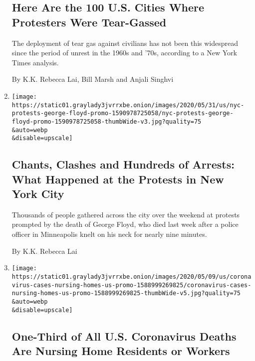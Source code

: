 \begin{enumerate}
  \hypertarget{here-are-the-100-us-cities-where-protesters-were-tear-gassed}{%
  \subsection{Here Are the 100 U.S. Cities Where Protesters Were
  Tear-Gassed}\label{here-are-the-100-us-cities-where-protesters-were-tear-gassed}}

  The deployment of tear gas against civilians has not been this
  widespread since the period of unrest in the 1960s and '70s, according
  to a New York Times analysis.

  By K.K. Rebecca Lai, Bill Marsh and Anjali Singhvi
\item
  \href{/interactive/2020/05/31/nyregion/nyc-protests-george-floyd.html}{}

  \texttt{[image: https://static01.graylady3jvrrxbe.onion/images/2020/05/31/us/nyc-protests-george-floyd-promo-1590978725058/nyc-protests-george-floyd-promo-1590978725058-thumbWide-v3.jpg?quality=75\\\&auto=webp\\\&disable=upscale]}

  \hypertarget{chants-clashes-and-hundreds-of-arrests-what-happened-at-the-protests-in-new-york-city}{%
  \subsection{Chants, Clashes and Hundreds of Arrests: What Happened at
  the Protests in New York
  City}\label{chants-clashes-and-hundreds-of-arrests-what-happened-at-the-protests-in-new-york-city}}

  Thousands of people gathered across the city over the weekend at
  protests prompted by the death of George Floyd, who died last week
  after a police officer in Minneapolis knelt on his neck for nearly
  nine minutes.

  By K.K. Rebecca Lai
\item
  \href{/interactive/2020/05/09/us/coronavirus-cases-nursing-homes-us.html}{}

  \texttt{[image: https://static01.graylady3jvrrxbe.onion/images/2020/05/09/us/coronavirus-cases-nursing-homes-us-promo-1588999269825/coronavirus-cases-nursing-homes-us-promo-1588999269825-thumbWide-v5.jpg?quality=75\\\&auto=webp\\\&disable=upscale]}

  \hypertarget{one-third-of-all-us-coronavirus-deaths-are-nursing-home-residents-or-workers}{%
  \subsection{One-Third of All U.S. Coronavirus Deaths Are Nursing Home
  Residents or
  Workers}\label{one-third-of-all-us-coronavirus-deaths-are-nursing-home-residents-or-workers}}


\end{enumerate}
